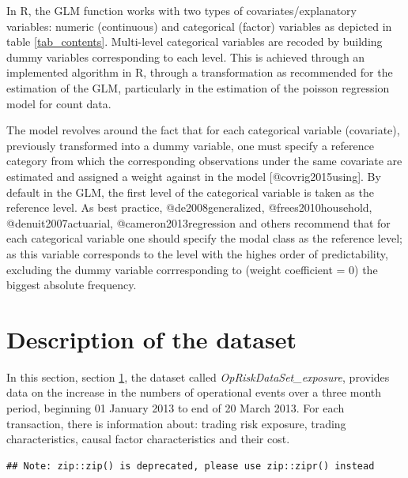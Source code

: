 \documentclass[]{article}
\begin{document}
In R, the GLM function works with two types of covariates/explanatory
variables: numeric (continuous) and categorical (factor) variables as
depicted in table \ref{tab_contents}. Multi-level categorical variables
are recoded by building dummy variables corresponding to each level.
This is achieved through an implemented algorithm in R, through a
transformation as recommended for the estimation of the GLM,
particularly in the estimation of the poisson regression model for count
data.\medskip

The model revolves around the fact that for each categorical variable
(covariate), previously transformed into a dummy variable, one must
specify a reference category from which the corresponding observations
under the same covariate are estimated and assigned a weight against in
the model {[}@covrig2015using{]}. By default in the GLM, the first level
of the categorical variable is taken as the reference level. As best
practice, @de2008generalized, @frees2010household, @denuit2007actuarial,
@cameron2013regression and others recommend that for each categorical
variable one should specify the modal class as the reference level; as
this variable corresponds to the level with the highes order of
predictability, excluding the dummy variable corrresponding to (weight
coefficient = \(0\)) the biggest absolute frequency.

\section{Description of the dataset}
\label{sec:Description of the dataset}

In this section, section \ref{sec:Description of the dataset}, the
dataset called \emph{OpRiskDataSet\_exposure}, provides data on the
increase in the numbers of operational events over a three month period,
beginning 01 January 2013 to end of 20 March 2013. For each transaction,
there is information about: trading risk exposure, trading
characteristics, causal factor characteristics and their cost.

\begin{verbatim}
## Note: zip::zip() is deprecated, please use zip::zipr() instead
\end{verbatim}
\end{document}
